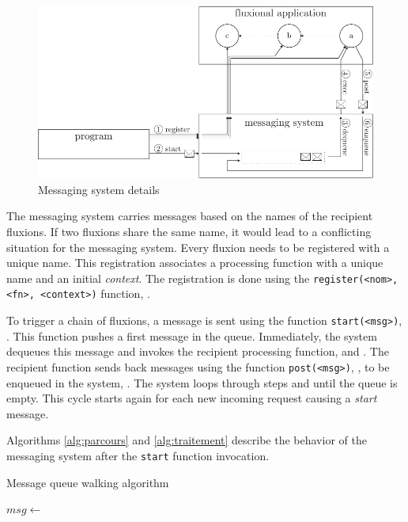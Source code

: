 \begin{figure}[h!]
  \includegraphics[width=\linewidth]{ressources/schema-message.pdf}
  \caption{Messaging system details}
  \label{fig:MesSys}
\end{figure}

The messaging system carries messages based on the names of the recipient fluxions.
If two fluxions share the same name, it would lead to a conflicting situation for the messaging system.
Every fluxion needs to be registered with a unique name.
This registration associates a processing function with a unique name and an initial \textit{context}.
The registration is done using the \texttt{register(<nom>, <fn>, <context>)} function, .

To trigger a chain of fluxions, a message is sent using the function \texttt{start(<msg>)}, .
This function pushes a first message in the queue.
Immediately, the system dequeues this message and invokes the recipient processing function,  and .
The recipient function sends back messages using the function \texttt{post(<msg>)}, , to be enqueued in the system, .
The system loops through steps  and  until the queue is empty.
This cycle starts again for each new incoming request causing a \textit{start} message.

Algorithms \ref{alg:parcours} and \ref{alg:traitement} describe the behavior of the messaging system after the \texttt{start} function invocation.

\begin{algorithm}
\caption{Message queue walking algorithm}
\label{alg:parcours}
\begin{algorithmic}
\State $msg \gets$  
\State {}
\EndWhile
\EndFunction
\end{algorithmic}
\end{algorithm}

